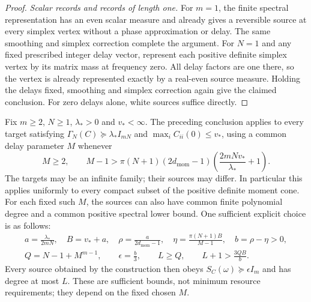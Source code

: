 \begin{proof}
\emph{Scalar records and records of length one.}
For $m=1$, the finite spectral representation has an even scalar
measure and already gives a reversible source at every
simplex vertex without a phase approximation or delay. The same
smoothing and simplex correction complete the argument.
For $N=1$ and any fixed prescribed integer delay vector, represent each
positive definite simplex vertex by its matrix mass at frequency zero.
All delay factors are one there, so the vertex is already represented
exactly by a real-even source measure. Holding the delays fixed,
smoothing and simplex correction again give the claimed conclusion.
For zero delays alone, white sources suffice directly.
\end{proof}

\begin{proposition}\label{prop:mc-uniform}
Fix $m\ge2$, $N\ge1$, $\lambda_*>0$ and $v_*<\infty$. The preceding
conclusion applies to every target satisfying
$\Gamma_N(C)\succeq\lambda_*I_{mN}$ and $\max_iC_{ii}(0)\le v_*$,
using a common delay parameter $M$ whenever
\[
 M\ge2,\qquad M-1>\pi(N+1)(2d_{\mathrm{mom}}-1)
                          \left(\frac{2mN v_*}{\lambda_*}+1\right).
\]
The targets may be an infinite family; their sources may differ. In
particular this applies uniformly to every compact subset of the
positive definite moment cone. For each fixed such $M$, the sources
can also have common finite polynomial degree and a common positive
spectral lower bound. One sufficient explicit choice is as follows:
\begin{gather*}
 a=\frac{\lambda_*}{2mN},\quad B=v_*+a,\quad
 \rho=\frac a{2d_{\mathrm{mom}}-1},\quad
 \eta=\frac{\pi(N+1)B}{M-1},\quad b=\rho-\eta>0,\\
 Q=N-1+M^{m-1},\qquad \epsilon=\frac b3,\qquad
 L\ge Q,\qquad L+1>\frac{3QB}{b}.
\end{gather*}
Every source obtained by the construction then obeys
$S_C(\omega)\succeq\epsilon I_m$ and has degree at most $L$.
These are sufficient bounds, not minimum resource requirements; they
depend on the fixed chosen $M$.
\end{proposition}
